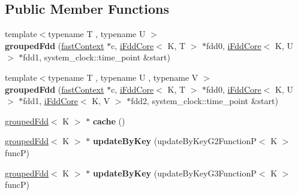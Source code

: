 \subsection*{Public Member Functions}
\begin{DoxyCompactItemize}
\item 
\hypertarget{classfaster_1_1groupedFdd_a3e057f8351843ebf4b2875d3bb763ccb}{}\label{classfaster_1_1groupedFdd_a3e057f8351843ebf4b2875d3bb763ccb} 
{\footnotesize template$<$typename T , typename U $>$ }\\{\bfseries grouped\+Fdd} (\hyperlink{classfaster_1_1fastContext}{fast\+Context} $\ast$c, \hyperlink{classfaster_1_1iFddCore}{i\+Fdd\+Core}$<$ K, T $>$ $\ast$fdd0, \hyperlink{classfaster_1_1iFddCore}{i\+Fdd\+Core}$<$ K, U $>$ $\ast$fdd1, system\+\_\+clock\+::time\+\_\+point \&start)
\item 
\hypertarget{classfaster_1_1groupedFdd_a0f6bb764367d709b4837afcdf2cf0c30}{}\label{classfaster_1_1groupedFdd_a0f6bb764367d709b4837afcdf2cf0c30} 
{\footnotesize template$<$typename T , typename U , typename V $>$ }\\{\bfseries grouped\+Fdd} (\hyperlink{classfaster_1_1fastContext}{fast\+Context} $\ast$c, \hyperlink{classfaster_1_1iFddCore}{i\+Fdd\+Core}$<$ K, T $>$ $\ast$fdd0, \hyperlink{classfaster_1_1iFddCore}{i\+Fdd\+Core}$<$ K, U $>$ $\ast$fdd1, \hyperlink{classfaster_1_1iFddCore}{i\+Fdd\+Core}$<$ K, V $>$ $\ast$fdd2, system\+\_\+clock\+::time\+\_\+point \&start)
\item 
\hypertarget{classfaster_1_1groupedFdd_af1256330323bf97826eaa01b0bb91bc1}{}\label{classfaster_1_1groupedFdd_af1256330323bf97826eaa01b0bb91bc1} 
\hyperlink{classfaster_1_1groupedFdd}{grouped\+Fdd}$<$ K $>$ $\ast$ {\bfseries cache} ()
\item 
\hypertarget{classfaster_1_1groupedFdd_a691248cca7dbed1f3b5cd827eb721dc8}{}\label{classfaster_1_1groupedFdd_a691248cca7dbed1f3b5cd827eb721dc8} 
\hyperlink{classfaster_1_1groupedFdd}{grouped\+Fdd}$<$ K $>$ $\ast$ {\bfseries update\+By\+Key} (update\+By\+Key\+G2\+FunctionP$<$ K $>$ funcP)
\item 
\hypertarget{classfaster_1_1groupedFdd_af24f53ee2d42e249fbd6c15ea6946abc}{}\label{classfaster_1_1groupedFdd_af24f53ee2d42e249fbd6c15ea6946abc} 
\hyperlink{classfaster_1_1groupedFdd}{grouped\+Fdd}$<$ K $>$ $\ast$ {\bfseries update\+By\+Key} (update\+By\+Key\+G3\+FunctionP$<$ K $>$ funcP)
\item 
\hypertarget{classfaster_1_1groupedFdd_ac986965bdb4e59de83e64b2cee70fbd6}{}\label{classfaster_1_1groupedFdd_ac986965bdb4e59de83e64b2cee70fbd6} 

\end{DoxyCompactItemize}
